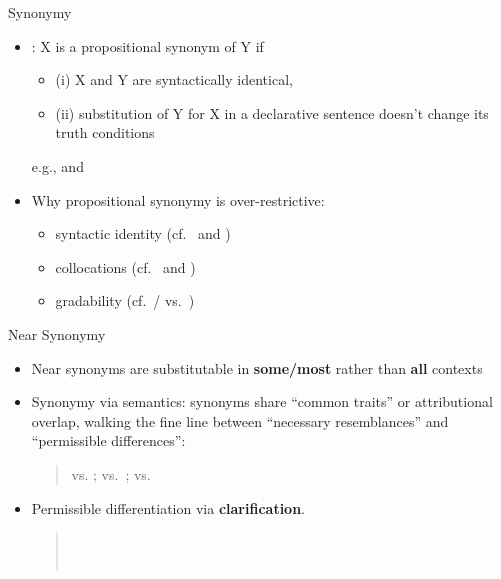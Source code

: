 \begin{frame}{Synonymy}

\begin{itemize}
\item {}: X is a propositional synonym of Y if
  \begin{itemize}
  \item   (i) X and Y are syntactically identical,
  \item (ii) substitution of Y  for X in a declarative sentence doesn't change its truth conditions
  \end{itemize}
  e.g.,  and 
\item Why propositional synonymy is over-restrictive:
  \begin{itemize}
  \item syntactic identity (cf.\  and )
  \item collocations (cf.\  and )
  \item gradability (cf.\ / vs.\ )
  \end{itemize}
\end{itemize}
\end{frame}

\begin{frame}{Near Synonymy}
\begin{itemize}
\item Near synonyms are substitutable in \textbf{some/most} rather than \textbf{all} contexts
\item Synonymy via semantics: synonyms share ``common traits'' or
  attributional overlap, walking the fine line between ``necessary
  resemblances'' and ``permissible differences'':
  \begin{quote}
       vs. ;   vs.\ ;  vs. 
  \end{quote}
\item Permissible differentiation via \textbf{clarification}.
  \begin{quote}
    \\
    \\   
    
  \end{quote}
%
\end{itemize}
\end{frame}


